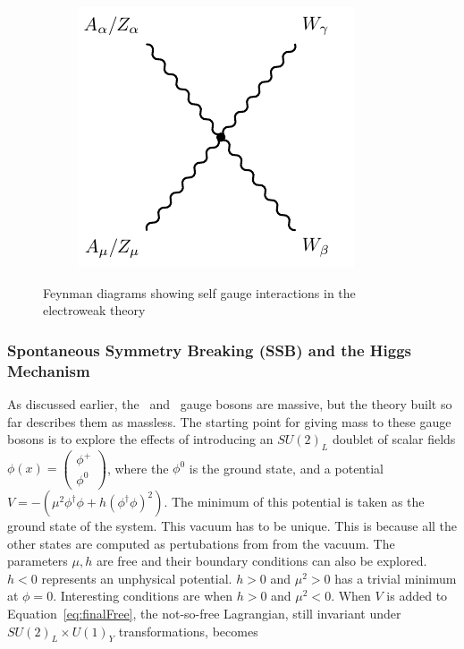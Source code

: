 \begin{figure}[!h]
\begin{subfigure}{0.33\textwidth}
\end{subfigure}%
\begin{subfigure}{0.33\textwidth}
   \includegraphics[width=\textwidth]{figures/w2z2.pdf}
\end{subfigure} %
\caption{Feynman diagrams showing self gauge interactions in the electroweak theory}
\label{fig:intGauge}
\end{figure}

\subsubsection{Spontaneous Symmetry Breaking (SSB) and the Higgs Mechanism}
\par As discussed earlier, the \Wpm\ and \Zboson\ gauge bosons are massive, but the theory 
built so far describes them as massless. The starting point for giving mass to these gauge bosons 
is to explore the effects of introducing an $SU(2)_L$ doublet of scalar 
fields $\phi(x) = \left (  \begin{smallmatrix} \phi^+ \\ \phi^0 \end{smallmatrix} \right )$, where the 
$\phi^0$ is the ground state, and a potential $V = - (\mu^2\phi^\dagger\phi + h(\phi^\dagger\phi)^2)$. 
The minimum of this potential is taken as the ground state of the system. This vacuum 
has to be unique. This is because all the other states are computed as pertubations from
 from the vacuum. 
The parameters $\mu,h$ are free and their boundary conditions can also be explored. 
$h<0$ represents an unphysical potential. $h>0$ and $\mu^2>0$ has a trivial minimum at $\phi = 0$.
Interesting conditions are when $h>0$ and $\mu^2<0$.
When $V$ is added to Equation~\ref{eq:finalFree}, the not-so-free Lagrangian, still 
invariant under $SU(2)_L\times U(1)_Y$ transformations, becomes 


